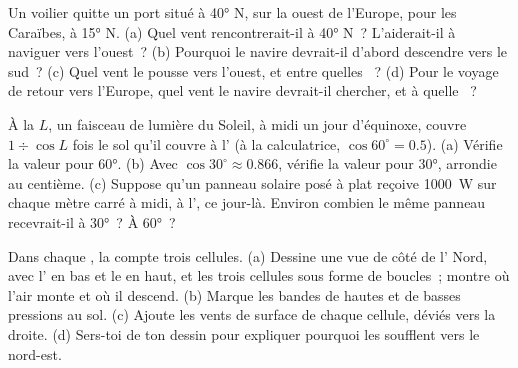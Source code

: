 \begin{exercise}[$\star\star$]\label{exo:g8:winds-global-circulation:10}
Un voilier quitte un port situé à \ang{40} N, sur la  ouest de
l'Europe, pour les Caraïbes, à \ang{15} N. (a) Quel vent rencontrerait-il
à \ang{40} N~? L'aiderait-il à naviguer vers l'ouest~? (b) Pourquoi le
navire devrait-il d'abord descendre vers le sud~? (c) Quel vent le pousse
vers l'ouest, et entre quelles ~? (d) Pour le voyage de retour
vers l'Europe, quel vent le navire devrait-il chercher, et à quelle
~?
\end{exercise}

\begin{exercise}[$\star\star\star$]\label{exo:g8:winds-global-circulation:11}
À la  $L$, un faisceau de lumière du Soleil, à midi un jour
d'équinoxe, couvre $1 \div
\cos L$ fois le sol qu'il couvre à l' (à la calculatrice,
$\cos 60^\circ = 0.5$). (a) Vérifie la valeur pour \ang{60}. (b) Avec
$\cos 30^\circ \approx 0.866$, vérifie la valeur pour \ang{30}, arrondie
au centième. (c) Suppose qu'un panneau solaire posé à plat reçoive
\qty{1000}{W} sur chaque mètre carré à midi, à l', ce jour-là.
Environ combien le même panneau recevrait-il à \ang{30}~? À \ang{60}~?
\end{exercise}

\begin{exercise}[$\star\star\star$]\label{exo:g8:winds-global-circulation:12}
Dans chaque , la  compte trois cellules.
(a) Dessine une vue de côté de l' Nord, avec l' en bas
et le  en haut, et les trois cellules sous forme de boucles~; montre
où l'air monte et où il descend. (b) Marque les bandes de hautes et de
basses pressions au sol. (c) Ajoute les vents de surface de chaque
cellule, déviés vers la droite. (d) Sers-toi de ton dessin pour expliquer
pourquoi les  soufflent vers le nord-est.
\end{exercise}

